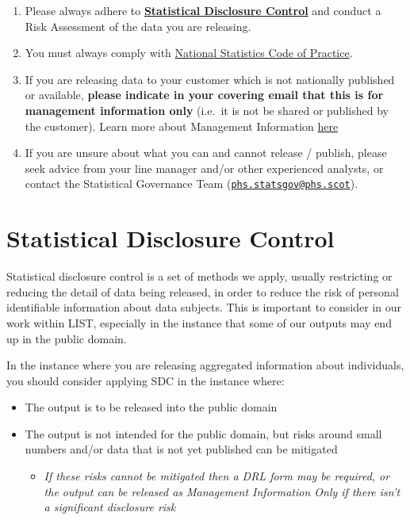 \documentclass[
]{book}
\providecommand{\tightlist}{%
  \setlength{\itemsep}{0pt}\setlength{\parskip}{0pt}}
\begin{document}
\begin{enumerate}
\def\labelenumi{\arabic{enumi}.}
\item
  Please always adhere to \textbf{\protect\hyperlink{sdc}{Statistical Disclosure Control}} and conduct a Risk Assessment of the data you are releasing.
\item
  You must always comply with \href{https://gss.civilservice.gov.uk/wp-content/uploads/2018/03/Code-of-Practice-for-Statistics-4.pdf}{National Statistics Code of Practice}.
\item
  If you are releasing data to your customer which is not nationally published or available, \textbf{please indicate in your covering email that this is for management information only} (i.e.~it is not be shared or published by the customer). Learn more about Management Information \protect\hyperlink{managementinformation}{here}
\item
  If you are unsure about what you can and cannot release / publish, please seek advice from your line manager and/or other experienced analysts, or contact the Statistical Governance Team (\href{mailto:phs.statsgov@phs.scot}{\nolinkurl{phs.statsgov@phs.scot}}).
\end{enumerate}

\hypertarget{sdc}{%
\section{Statistical Disclosure Control}\label{sdc}}

Statistical disclosure control is a set of methods we apply, usually restricting or reducing the detail of data being released, in order to reduce the risk of personal identifiable information about data subjects. This is important to consider in our work within LIST, especially in the instance that some of our outputs may end up in the public domain.

In the instance where you are releasing aggregated information about individuals, you should consider applying SDC in the instance where:

\begin{itemize}
\item
  The output is to be released into the public domain
\item
  The output is not intended for the public domain, but risks around small numbers and/or data that is not yet published can be mitigated

  \begin{itemize}
  \tightlist
  \item
    \emph{If these risks cannot be mitigated then a DRL form may be required, or the output can be released as Management Information Only if there isn't a significant disclosure risk}
  \end{itemize}
\end{itemize}
\end{document}
